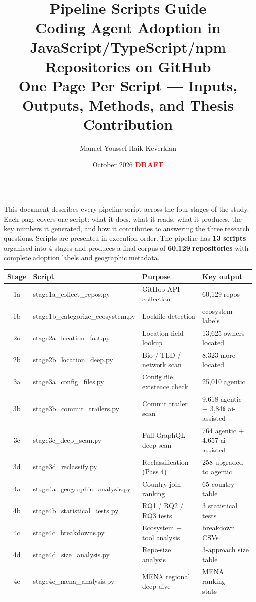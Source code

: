 \documentclass[11pt,a4paper]{article}
\title{%
  \vspace{-1cm}
  \textbf{\color{stageblue}Pipeline Scripts Guide}\\[0.3em]
  \large Coding Agent Adoption in JavaScript/TypeScript/npm\\
  Repositories on GitHub\\[0.4em]
  \normalsize One Page Per Script --- Inputs, Outputs, Methods, and Thesis Contribution
}
\author{Manuel Youssef Haik Kevorkian}
\date{October 2026 \quad \textcolor{red}{\textbf{DRAFT}}}
\begin{document}
\maketitle
\thispagestyle{fancy}
\vspace{-0.5cm}
\hrule
\vspace{0.3cm}

{\small
This document describes every pipeline script across the four stages of the study.
Each page covers one script: what it does, what it reads, what it produces,
the key numbers it generated, and how it contributes to answering the three
research questions. Scripts are presented in execution order.
The pipeline has \textbf{13 scripts} organised into 4 stages and produces
a final corpus of \textbf{60,129 repositories} with complete adoption labels
and geographic metadata.
}

\vspace{0.4cm}
\begin{center}
\begin{tabular}{@{}clll@{}}
\toprule
\textbf{Stage} & \textbf{Script} & \textbf{Purpose} & \textbf{Key output} \\
\midrule
1a & stage1a\_collect\_repos.py    & GitHub API collection        & 60,129 repos \\
1b & stage1b\_categorize\_ecosystem.py & Lockfile detection      & ecosystem labels \\
2a & stage2a\_location\_fast.py   & Location field lookup        & 13,625 owners located \\
2b & stage2b\_location\_deep.py   & Bio / TLD / network scan     & 8,323 more located \\
3a & stage3a\_config\_files.py    & Config file existence check  & 25,010 agentic \\
3b & stage3b\_commit\_trailers.py & Commit trailer scan          & 9,618 agentic + 3,846 ai-assisted \\
3c & stage3c\_deep\_scan.py       & Full GraphQL deep scan       & 764 agentic + 4,657 ai-assisted \\
3d & stage3d\_reclassify.py       & Reclassification (Pass 4)    & 258 upgraded to agentic \\
4a & stage4a\_geographic\_analysis.py & Country join + ranking   & 65-country table \\
4b & stage4b\_statistical\_tests.py   & RQ1 / RQ2 / RQ3 tests    & 3 statistical tests \\
4c & stage4c\_breakdowns.py           & Ecosystem + tool analysis & breakdown CSVs \\
4d & stage4d\_size\_analysis.py        & Repo-size analysis        & 3-approach size table \\
4e & stage4e\_mena\_analysis.py        & MENA regional deep-dive   & MENA ranking + stats \\
\bottomrule
\end{tabular}
\end{center}
\end{document}
